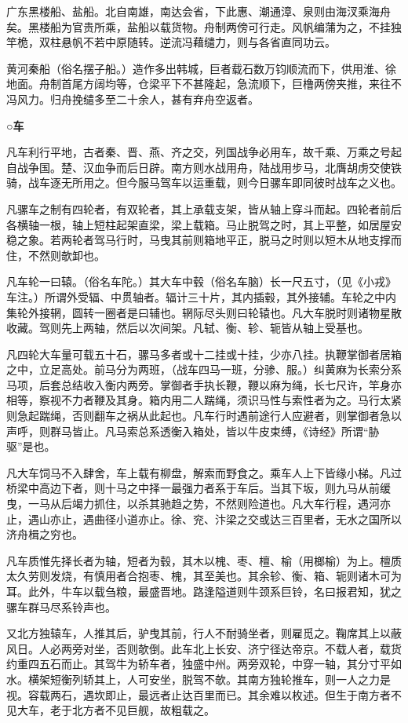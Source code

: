 \documentclass[]{article}
\begin{document}
广东黑楼船、盐船。北自南雄，南达会省，下此惠、潮通漳、泉则由海汊乘海舟矣。黑楼船为官贵所乘，盐船以载货物。舟制两傍可行走。风帆编蒲为之，不挂独竿桅，双柱悬帆不若中原随转。逆流冯藉缱力，则与各省直同功云。

黄河秦船（俗名摆子船。）造作多出韩城，巨者载石数万钧顺流而下，供用淮、徐地面。舟制首尾方阔均等，仓梁平下不甚隆起，急流顺下，巨橹两傍夹推，来往不冯风力。归舟挽缱多至二十余人，甚有弃舟空返者。

\textbf{○车}

凡车利行平地，古者秦、晋、燕、齐之交，列国战争必用车，故千乘、万乘之号起自战争国。楚、汉血争而后日辟。南方则水战用舟，陆战用步马，北膺胡虏交使铁骑，战车逐无所用之。但今服马驾车以运重载，则今日骡车即同彼时战车之义也。

凡骡车之制有四轮者，有双轮者，其上承载支架，皆从轴上穿斗而起。四轮者前后各横轴一根，轴上短柱起架直梁，梁上载箱。马止脱驾之时，其上平整，如居屋安稳之象。若两轮者驾马行时，马曳其前则箱地平正，脱马之时则以短木从地支撑而住，不然则欹卸也。

凡车轮一曰辕。（俗名车陀。）其大车中毂（俗名车脑）长一尺五寸，（见《小戎》车注。）所谓外受辐、中贯轴者。辐计三十片，其内插毂，其外接辅。车轮之中内集轮外接辋，圆转一圈者是曰辅也。辋际尽头则曰轮辕也。凡大车脱时则诸物星散收藏。驾则先上两轴，然后以次间架。凡轼、衡、轸、轭皆从轴上受基也。

凡四轮大车量可载五十石，骡马多者或十二挂或十挂，少亦八挂。执鞭掌御者居箱之中，立足高处。前马分为两班，（战车四马一班，分骖、服。）纠黄麻为长索分系马项，后套总结收入衡内两旁。掌御者手执长鞭，鞭以麻为绳，长七尺许，竿身亦相等，察视不力者鞭及其身。箱内用二人踹绳，须识马性与索性者为之。马行太紧则急起踹绳，否则翻车之祸从此起也。凡车行时遇前途行人应避者，则掌御者急以声呼，则群马皆止。凡马索总系透衡入箱处，皆以牛皮束缚，《诗经》所谓``胁驱''是也。

凡大车饲马不入肆舍，车上载有柳盘，解索而野食之。乘车人上下皆缘小梯。凡过桥梁中高边下者，则十马之中择一最强力者系于车后。当其下坂，则九马从前缓曳，一马从后竭力抓住，以杀其驰趋之势，不然则险道也。凡大车行程，遇河亦止，遇山亦止，遇曲径小道亦止。徐、兖、汴梁之交或达三百里者，无水之国所以济舟楫之穷也。

凡车质惟先择长者为轴，短者为毂，其木以槐、枣、檀、榆（用榔榆）为上。檀质太久劳则发烧，有慎用者合抱枣、槐，其至美也。其余轸、衡、箱、轭则诸木可为耳。此外，牛车以载刍粮，最盛晋地。路逢隘道则牛颈系巨铃，名曰报君知，犹之骡车群马尽系铃声也。

又北方独辕车，人推其后，驴曳其前，行人不耐骑坐者，则雇觅之。鞠席其上以蔽风日。人必两旁对坐，否则欹倒。此车北上长安、济宁径达帝京。不载人者，载货约重四五石而止。其驾牛为轿车者，独盛中州。两旁双轮，中穿一轴，其分寸平如水。横架短衡列轿其上，人可安坐，脱驾不欹。其南方独轮推车，则一人之力是视。容载两石，遇坎即止，最远者止达百里而已。其余难以枚述。但生于南方者不见大车，老于北方者不见巨舰，故粗载之。
\end{document}
